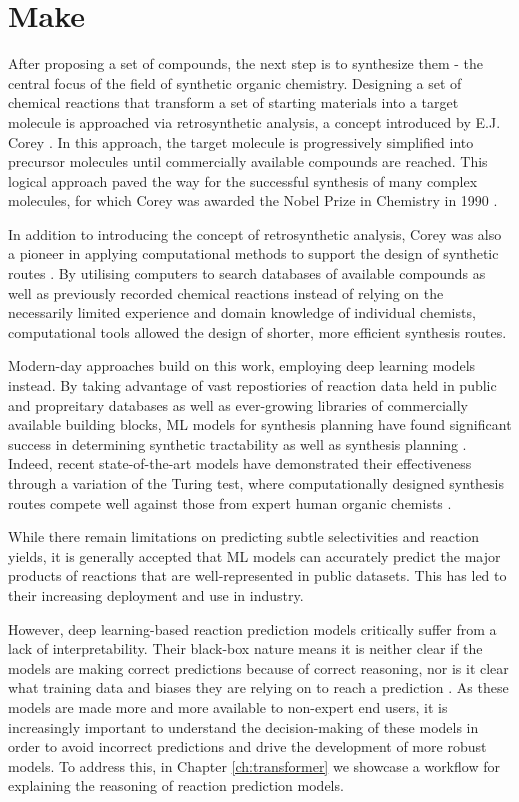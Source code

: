 \section*{Make}
After proposing a set of compounds, the next step is to synthesize them - the central focus of the field of synthetic organic chemistry. Designing a set of chemical reactions that transform a set of starting materials into a target molecule is approached via retrosynthetic analysis, a concept introduced by E.J. Corey \cite{corey1991logic}. In this approach, the target molecule is progressively simplified into  precursor molecules until commercially available compounds are reached. This logical approach paved the way for the successful synthesis of many complex molecules, for which Corey was awarded the Nobel Prize in Chemistry in 1990 \cite{NobelCorey}.

In addition to introducing the concept of retrosynthetic analysis, Corey was also a pioneer in applying computational methods to support the design of synthetic routes \cite{Corey1985ComputerAssistedSynthesis}. By utilising computers to search databases of available compounds as well as previously recorded chemical reactions instead of relying on the necessarily limited experience and domain knowledge of individual chemists, computational tools allowed the design of shorter, more efficient synthesis routes.

Modern-day approaches build on this work, employing deep learning models instead. By taking advantage of vast repostiories of reaction data held in public and propreitary databases as well as ever-growing libraries of commercially available building blocks, ML models for synthesis planning have found significant success in determining synthetic tractability as well as synthesis planning \cite{Coley2018}. Indeed, recent state-of-the-art models have demonstrated their effectiveness through a variation of the Turing test, where computationally designed synthesis routes compete well against those from expert human organic chemists \cite{Coley19WLDN5}.

While there remain limitations on predicting subtle selectivities and reaction yields, it is generally accepted that ML models can accurately predict the major products of reactions that are well-represented in public datasets. This has led to their increasing deployment and use in industry.

However, deep learning-based reaction prediction models critically suffer from a lack of interpretability. Their black-box nature means it is neither clear if the models are making correct predictions because of correct reasoning, nor is it clear what training data and biases they are relying on to reach a prediction \cite{Jimenze2020XAI}. As these models are made more and more available to non-expert end users, it is increasingly important to understand the decision-making of these models in order to avoid incorrect predictions and drive the development of more robust models. To address this, in Chapter \ref{ch:transformer} we showcase a workflow for explaining the reasoning of reaction prediction models.

